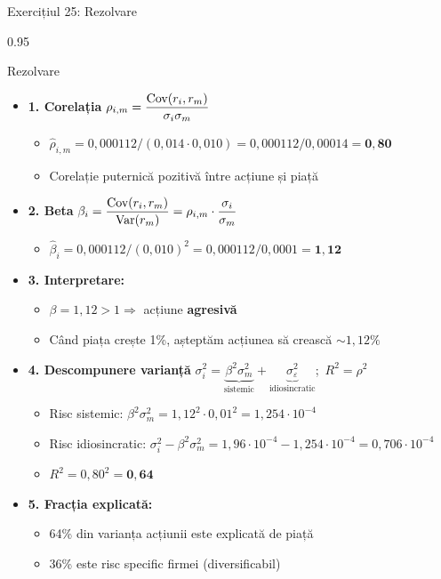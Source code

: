 \documentclass[9pt, aspectratio=169, t]{beamer}
\begin{document}
\begin{frame}[shrink=25]{Exercițiul 25: Rezolvare}
\begin{cminipage}{0.95\textwidth}
\begin{exampleblock}{Rezolvare}
\begin{itemize}\setlength{\itemsep}{0pt}
    \item \textbf{1. Corelația} \quad $\rho_{i,m} = \dfrac{\text{Cov}(r_i, r_m)}{\sigma_i \sigma_m}$
    \begin{itemize}\setlength{\itemsep}{0pt}
        \item $\hat\rho_{i,m} = 0{,}000112 / (0{,}014 \cdot 0{,}010) = 0{,}000112 / 0{,}00014 = \mathbf{0{,}80}$
        \item Corelație puternică pozitivă între acțiune și piață
    \end{itemize}
    \item \textbf{2. Beta} \quad $\beta_i = \dfrac{\text{Cov}(r_i, r_m)}{\text{Var}(r_m)} = \rho_{i,m} \cdot \dfrac{\sigma_i}{\sigma_m}$
    \begin{itemize}\setlength{\itemsep}{0pt}
        \item $\hat\beta_i = 0{,}000112 / (0{,}010)^2 = 0{,}000112 / 0{,}0001 = \mathbf{1{,}12}$
    \end{itemize}
    \item \textbf{3. Interpretare:}
    \begin{itemize}\setlength{\itemsep}{0pt}
        \item $\beta = 1{,}12 > 1 \Rightarrow$ acțiune \textbf{agresivă}
        \item Când piața crește 1\%, așteptăm acțiunea să crească $\sim 1{,}12\%$
    \end{itemize}
    \item \textbf{4. Descompunere varianță} \quad $\sigma_i^2 = \underbrace{\beta^2 \sigma_m^2}_{\text{sistemic}} + \underbrace{\sigma_\varepsilon^2}_{\text{idiosincratic}}$;\ $R^2 = \rho^2$
    \begin{itemize}\setlength{\itemsep}{0pt}
        \item Risc sistemic: $\beta^2 \sigma_m^2 = 1{,}12^2 \cdot 0{,}01^2 = 1{,}254 \cdot 10^{-4}$
        \item Risc idiosincratic: $\sigma_i^2 - \beta^2 \sigma_m^2 = 1{,}96 \cdot 10^{-4} - 1{,}254 \cdot 10^{-4} = 0{,}706 \cdot 10^{-4}$
        \item $R^2 = 0{,}80^2 = \mathbf{0{,}64}$
    \end{itemize}
    \item \textbf{5. Fracția explicată:}
    \begin{itemize}\setlength{\itemsep}{0pt}
        \item 64\% din varianța acțiunii este explicată de piață
        \item 36\% este risc specific firmei (diversificabil)
    \end{itemize}
\end{itemize}
\end{exampleblock}
\end{cminipage}
\end{frame}
\end{document}
